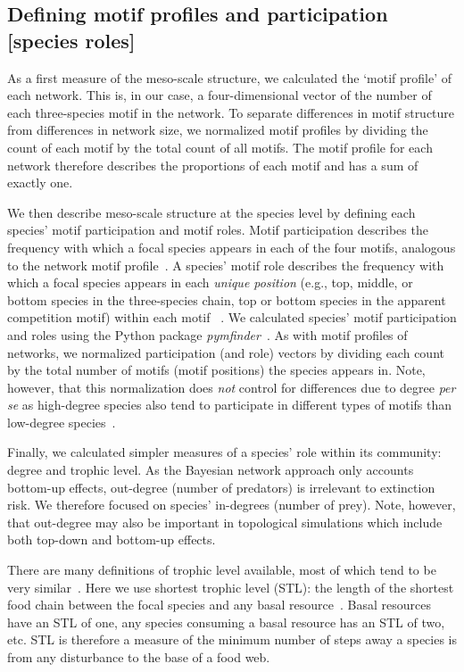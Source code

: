 \documentclass[12pt]{article}
\begin{document}
\begin{spacing}{2.0}
	\subsection*{Defining motif profiles and participation [species roles]}

        As a first measure of the meso-scale structure, we calculated the `motif profile' of each network.
        This is, in our case, a four-dimensional vector of the number of each three-species motif in the network.
        To separate differences in motif structure from differences in network size, we normalized motif profiles by dividing the count of each motif by the total count of all motifs.
        The motif profile for each network therefore describes the proportions of each motif and has a sum of exactly one.

    
        We then describe meso-scale structure at the species level by defining each species' motif participation and motif roles.
        Motif participation describes the frequency with which a focal species appears in each of the four motifs, analogous to the network motif profile~\citep{Stouffer2012}.
        A species' motif role describes the frequency with which a focal species appears in each \emph{unique position} (e.g., top, middle, or bottom species in the three-species chain, top or bottom species in the apparent competition motif) within each motif ~\citep{Stouffer2012,Cirtwill2017}.
		We calculated species' motif participation and roles using the Python package \emph{pymfinder}~\citep{pymfinder}.
        As with motif profiles of networks, we normalized participation (and role) vectors by dividing each count by the total number of motifs (motif positions) the species appears in.
        Note, however, that this normalization does \emph{not} control for differences due to degree \emph{per se} as high-degree species also tend to participate in different types of motifs than low-degree species~\citep{Cirtwill2021_inprep}.
        
        
        Finally, we calculated simpler measures of a species' role within its community: degree and trophic level.
		As the Bayesian network approach only accounts  bottom-up effects, out-degree (number of predators) is irrelevant to extinction risk.
		We therefore focused on species' in-degrees (number of prey).
		Note, however, that out-degree may also be important in topological simulations which include both top-down and bottom-up effects. 


		There are many definitions of trophic level available, most of which tend to be very similar~\citep{Carscallen2012}.
		Here we use shortest trophic level (STL): the length of the shortest food chain between the focal species and any basal resource~\citep{Williams2004}. 
		Basal resources have an STL of one, any species consuming a basal resource has an STL of two, etc.
        STL is therefore a measure of the minimum number of steps away a species is from any disturbance to the base of a food web.



\end{spacing}
\end{document}

